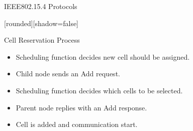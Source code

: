 \begin{withoutheadline}
\begin{frame}{IEEE802.15.4 Protocols}


[rounded][shadow=false]
\begin{block}{Cell Reservation Process}
    \begin{itemize}
    \item  Scheduling function decides new cell should be assigned.
    \item<2-> Child node sends an Add request. 
    \item<3-> Scheduling function decides which cells to be selected. 
    \item<4-> Parent node replies with an Add response.
    \item<5-> Cell is added and communication start.
    \end{itemize}
    \end{block}

\begin{figure}[p]


\end{figure}
\end{frame}
\end{withoutheadline}

